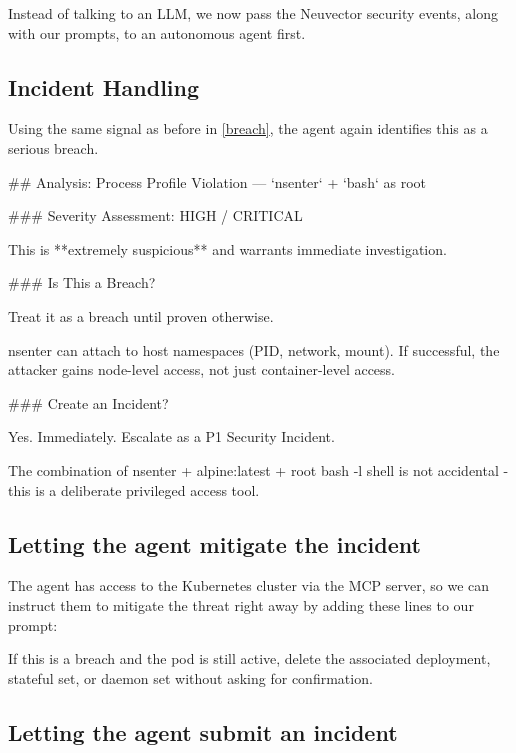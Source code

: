 Instead of talking to an LLM, we now pass the Neuvector security events, along with our prompts, to an autonomous agent first.

\subsection{Incident Handling}

Using the same signal as before in \ref{breach}, the agent again identifies this as a serious breach.

\indent\colorbox{codegrey}{
    \parbox{0.8\linewidth}{
\#\# Analysis: Process Profile Violation — `nsenter` + `bash` as root
    }
}

\indent\colorbox{codegrey}{
    \parbox{0.8\linewidth}{
\#\#\# Severity Assessment: HIGH / CRITICAL

This is **extremely suspicious** and warrants immediate investigation.
     }
}

\indent\colorbox{codegrey}{
    \parbox{0.8\linewidth}{
\#\#\# Is This a Breach?

Treat it as a breach until proven otherwise.

nsenter can attach to host namespaces (PID, network, mount). If successful, the attacker gains node-level access, not just container-level access.
     }
}

\indent\colorbox{codegrey}{
    \parbox{0.8\linewidth}{
\#\#\# Create an Incident?

Yes. Immediately. Escalate as a P1 Security Incident.

The combination of nsenter + alpine:latest + root bash -l shell is not accidental - this is a deliberate privileged access tool.
     }
}

\subsection{Letting the agent mitigate the incident}

The agent has access to the Kubernetes cluster via the MCP server, so we can instruct them to mitigate the threat right away by adding these lines to our prompt:

\indent\colorbox{codegrey}{
    \parbox{0.8\linewidth}{
If this is a breach and the pod is still active, delete the associated deployment, stateful set, or daemon set without asking for confirmation.
     }
}

\subsection{Letting the agent submit an incident}

